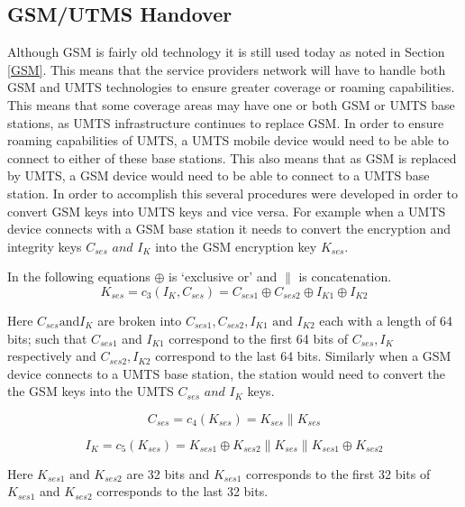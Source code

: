 \documentclass{sig-alternate}
\begin{document}
	\subsection{GSM/UTMS Handover \label{Handover}}
	Although GSM is fairly old technology it is still used today as noted in Section \ref{GSM}. This means that the service providers network will have to handle both GSM and UMTS technologies to ensure greater coverage or roaming capabilities. This means that some coverage areas may have one or both GSM or UMTS base stations, as UMTS infrastructure continues to replace GSM. In order to ensure roaming capabilities of UMTS, a UMTS mobile device would need to be able to connect to either of these base stations. This also means that as GSM is replaced by UMTS, a GSM device would need to be able to connect to a UMTS base station. In order to accomplish this several procedures were developed in order to convert GSM keys into UMTS keys and vice versa. For example when a UMTS device connects with a GSM base station it needs to convert the encryption and integrity keys $\mathit{C_{ses}\text{ and } I_{K}}$ into the GSM encryption key $K_{ses}$.   
	
	In the following equations $\oplus$ is `exclusive or' and $\|$ is concatenation.
\begin{equation}
	\label{C_3}
	\mathit{K_{ses} = c_{3}(I_{K},C_{ses}) = C_{ses1} \oplus C_{ses2}\oplus I_{K1} \oplus I_{K2}}
\end{equation}

Here $C_{ses} \text{and} I_{K} $ are broken into  $C_{ses1},C_{ses2},I_{K1}\text{ and }I_{K2}$ each with a length of 64 bits; such that $C_{ses1}$ and $I_{K1}$ correspond to the first 64 bits of $C_{ses},I_{K}$ respectively and $C_{ses2},I_{K2}$ correspond to the last 64 bits.
 Similarly when a GSM device connects to a UMTS base station, the station would need to convert the the GSM keys into the UMTS $\mathit{C_{ses} \text{ and } I_{K}}$ keys. 

\begin{equation} 
\label{C_4}
	\mathit{C_{ses} = c_{4}(K_{ses}) = K_{ses} \| K_{ses}}
\end{equation}

\begin{equation}
\label{C_5}
	\mathit{I_{K} = c_{5}(K_{ses}) = K_{ses1}\oplus K_{ses2}\|K_{ses}\|K_{ses1}\oplus K_{ses2}}
\end{equation}

Here $K_{ses1} \text{ and } K_{ses2}$ are 32 bits and $K_{ses1}$ corresponds to the first 32 bits of $K_{ses1}$ and $K_{ses2}$ corresponds to the last 32 bits.
 
\end{document}
